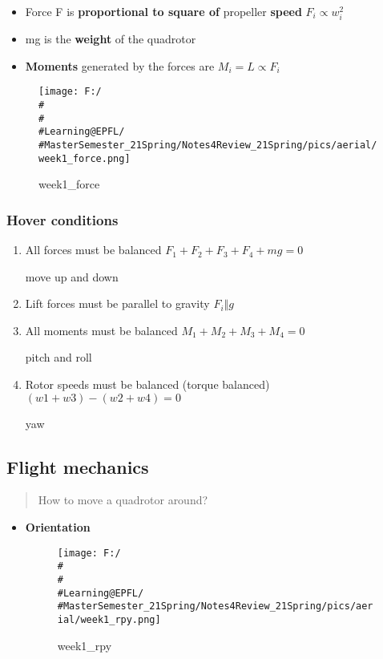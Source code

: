 \documentclass[]{article}
\begin{document}
\begin{itemize}
\item
  Force F is \textbf{proportional to square of} propeller \textbf{speed}
  \(F_i \propto w_i^2\)
\item
  mg is the \textbf{weight} of the quadrotor
\item
  \textbf{Moments} generated by the forces are \(M_i = L \propto F_i\)
\end{itemize}

\begin{figure}
\centering
\texttt{[image: F:/\\\#\\\#\\\#Learning@EPFL/\\\#MasterSemester\_21Spring/Notes4Review\_21Spring/pics/aerial/week1\_force.png]}
\caption{week1\_force}
\end{figure}

\subsubsection{Hover conditions}\label{header-n246}

\begin{enumerate}
\def\labelenumi{\arabic{enumi}.}
\item
  All forces must be balanced \(F_1+ F_2+ F_3+ F_4+ mg = 0\)

  move up and down
\item
  Lift forces must be parallel to gravity \(F_i \Vert g\)
\item
  All moments must be balanced \(M_1+M_2+M_3+M_4 = 0\)

  pitch and roll
\item
  Rotor speeds must be balanced (torque balanced) \((w1+w3)-(w2+w4) =0\)

  yaw
\end{enumerate}

\subsection{Flight mechanics}\label{header-n259}

\begin{quote}
How to move a quadrotor around?
\end{quote}

\begin{itemize}
\item
  \textbf{Orientation}

  \begin{figure}
  \centering
  \texttt{[image: F:/\\\#\\\#\\\#Learning@EPFL/\\\#MasterSemester\_21Spring/Notes4Review\_21Spring/pics/aerial/week1\_rpy.png]}
  \caption{week1\_rpy}
  \end{figure}
\end{itemize}
\end{document}
